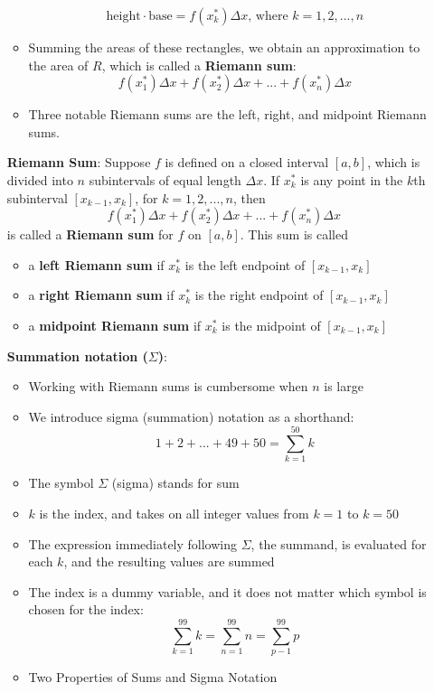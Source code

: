 \documentclass{article}
\begin{document}
\begin{itemize}
\begin{itemize}
            $$\text{height} \cdot \text{base} = f(x_k^*)\Delta x\text{, where } k = 1,2,...,n$$
        \item Summing the areas of these rectangles, we obtain an approximation to the area of $R$, which is called a \textbf{Riemann sum}:
            $$f(x_1^*)\Delta x + f(x_2^*)\Delta x + ... + f(x_n^*)\Delta x$$
        \item Three notable Riemann sums are the left, right, and midpoint Riemann sums.
    \end{itemize}
    \textbf{Riemann Sum}: Suppose $f$ is defined on a closed interval $[a,b]$, which is divided into $n$ subintervals of equal length $\Delta x$. If $x_k^*$ is any point in the $k$th subinterval $[x_{k - 1}, x_k]$, for $k = 1,2,...,n$, then
        $$f(x_1^*)\Delta x + f(x_2^*)\Delta x + ... + f(x_n^*)\Delta x$$
    is called a \textbf{Riemann sum} for $f$ on $[a,b]$. This sum is called
        \begin{itemize}
            \item a \textbf{left Riemann sum} if $x_k^*$ is the left endpoint of $[x_{k - 1}, x_k]$
            \item a \textbf{right Riemann sum} if $x_k^*$ is the right endpoint of $[x_{k - 1}, x_k]$
            \item a \textbf{midpoint Riemann sum} if $x_k^*$ is the midpoint of $[x_{k - 1}, x_k]$
        \end{itemize}
    \textbf{Summation notation ($\Sigma$)}:
        \begin{itemize}
            \item Working with Riemann sums is cumbersome when $n$ is large
            \item We introduce sigma (summation) notation as a shorthand:
                $$1 + 2 + ... + 49 + 50 = \sum_{k = 1}^{50}{k}$$
            \item The symbol $\Sigma$ (sigma) stands for sum
            \item $k$ is the index, and takes on all integer values from $k = 1$ to $k = 50$
            \item The expression immediately following $\Sigma$, the summand, is evaluated for each $k$, and the resulting values are summed
            \item The index is a dummy variable, and it does not matter which symbol is chosen for the index:
                $$\sum_{k = 1}^{99}{k} = \sum_{n = 1}^{99}{n} = \sum_{p - 1}^{99}{p}$$
            \item Two Properties of Sums and Sigma Notation

\end{itemize}
\end{itemize}
\end{document}
